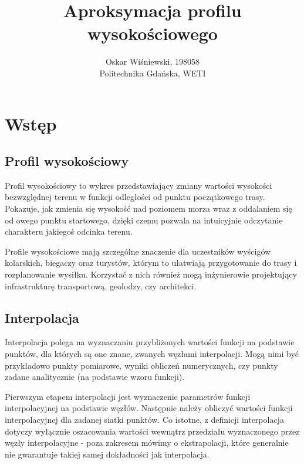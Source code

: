 \documentclass[a4paper,12pt]{article}
\title{\textbf{Aproksymacja profilu wysokościowego}}
\author{Oskar Wiśniewski, 198058\\
Politechnika Gdańska, WETI}
\begin{document}
\maketitle

\section{Wstęp}
	\subsection{Profil wysokościowy}
	Profil wysokościowy to wykres przedstawiający zmiany wartości wysokości bezwzględnej terenu w funkcji odległości od punktu początkowego trasy. Pokazuje, jak zmienia się wysokość nad poziomem morza wraz z oddalaniem się od owego punktu startowego, dzięki czemu pozwala na intuicyjnie odczytanie charakteru jakiegoś odcinka terenu.
	\par Profile wysokościowe mają szczególne znaczenie dla uczestników wyścigów kolarskich, biegaczy oraz turystów, którym to ułatwiają przygotowanie do trasy i rozplanowanie wysiłku. Korzystać z nich również mogą inżynierowie projektujący infrastrukturę transportową, geolodzy, czy architekci. 
	
	\subsection{Interpolacja}
	Interpolacja polega na wyznaczaniu przybliżonych wartości funkcji na podstawie punktów, dla których są one znane, zwanych węzłami interpolacji. Mogą nimi być przykładowo punkty pomiarowe, wyniki obliczeń numerycznych, czy punkty zadane analitycznie (na podstawie wzoru funkcji).
	\par Pierwszym etapem interpolacji jest wyznaczenie parametrów funkcji interpolacyjnej na podstawie węzłów. Następnie należy obliczyć wartości funkcji interpolacyjnej dla zadanej siatki punktów. Co istotne, z definicji interpolacja dotyczy wyłącznie oszacowania wartości wewnątrz przedziału wyznaczonego przez węzły interpolacyjne - poza zakresem mówimy o ekstrapolacji, które generalnie nie gwarantuje takiej samej dokładności jak interpolacja.
\end{document}

